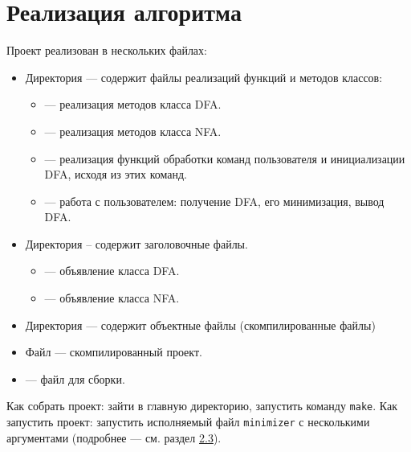 \documentclass{article}
\begin{document}
\section{Реализация алгоритма}
Проект реализован в нескольких файлах:
\begin{itemize}
  \item Директория  --- содержит файлы реализаций функций и методов классов:
  \begin{itemize}
    \item[\ding{118}]  --- реализация методов класса DFA.
    \item[\ding{118}]  --- реализация методов класса NFA.
    \item[\ding{118}]  --- реализация функций обработки команд пользователя и инициализации DFA, исходя из этих команд.
    \item[\ding{118}]  --- работа с пользователем: получение DFA, его минимизация, вывод DFA.
  \end{itemize}
  \item Директория  -- содержит заголовочные файлы.
  \begin{itemize}
    \item[\ding{118}]  --- объявление класса DFA.
    \item[\ding{118}]  --- объявление класса NFA.
  \end{itemize}
  \item Директория  --- содержит объектные файлы (скомпилированные  файлы)
  \item Файл  --- скомпилированный проект.
  \item {} --- файл для сборки.
\end{itemize}
Как собрать проект: зайти в главную директорию, запустить команду \lstinline[language=C++]!make!. Как запустить проект: запустить исполняемый файл \lstinline[language=C++]!minimizer! с несколькими аргументами (подробнее --- см. раздел \hyperlink{p1}{2.3}).
\end{document}
